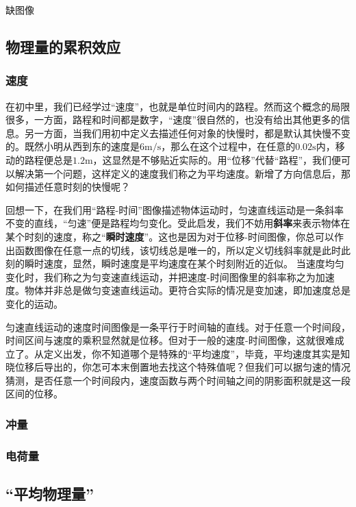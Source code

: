 
\begin{issues}
\issueTODO 缺图像
\end{issues}

\subsection{物理量的累积效应}

\subsubsection{速度}
在初中里，我们已经学过“速度”，也就是单位时间内的路程。然而这个概念的局限很多，一方面，路程和时间都是数字，“速度”很自然的，也没有给出其他更多的信息。另一方面，当我们用初中定义去描述任何对象的快慢时，都是默认其快慢不变的。既然小明从西到东的速度是$6 \mathrm{m/s}$，那么在这个过程中，在任意的$0.02\mathrm s$内，移动的路程便总是$1.2\mathrm m$，这显然是不够贴近实际的。用“位移”代替“路程”，我们便可以解决第一个问题，这样定义的速度我们称之为平均速度。新增了方向信息后，那如何描述任意时刻的快慢呢？

回想一下，在我们用“路程-时间”图像描述物体运动时，匀速直线运动是一条斜率不变的直线，“匀速”便是路程均匀变化。受此启发，我们不妨用\textbf{斜率}来表示物体在某个时刻的速度，称之“\textbf{瞬时速度}”。这也是因为对于位移-时间图像，你总可以作出函数图像在任意一点的切线，该切线总是唯一的，所以定义切线斜率就是此时此刻的瞬时速度，显然，瞬时速度是平均速度在某个时刻附近的近似。
当速度均匀变化时，我们称之为匀变速直线运动，并把速度-时间图像里的斜率称之为加速度。物体并非总是做匀变速直线运动。更符合实际的情况是变加速，即加速度总是变化的运动。

匀速直线运动的速度时间图像是一条平行于时间轴的直线。对于任意一个时间段，时间区间与速度的乘积显然就是位移。但对于一般的速度-时间图像，这就很难成立了。从定义出发，你不知道哪个是特殊的“平均速度”，毕竟，平均速度其实是知晓位移后导出的，你怎可本末倒置地去找这个特殊值呢？但我们可以据匀速的情况猜测，是否任意一个时间段内，速度函数与两个时间轴之间的阴影面积就是这一段区间的位移。

\subsubsection{冲量}
\subsubsection{电荷量}
\subsection{“平均物理量”}